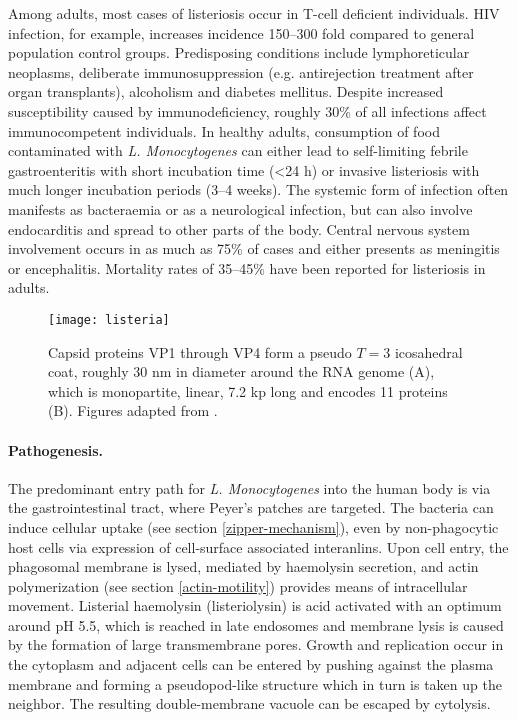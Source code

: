 Among adults, most cases of listeriosis occur in T-cell deficient individuals. HIV infection, for example, increases incidence 150--300 fold compared to general population control groups. Predisposing conditions include lymphoreticular neoplasms, deliberate immunosuppression (e.g. antirejection treatment after organ transplants), alcoholism and diabetes mellitus. Despite increased susceptibility caused by immunodeficiency, roughly 30\% of all infections affect immunocompetent individuals. In healthy adults, consumption of food contaminated with \textit{L. Monocytogenes} can either lead to self-limiting febrile gastroenteritis with short incubation time (\textless 24 h) or invasive listeriosis with much longer incubation periods (3--4 weeks). The systemic form of infection often manifests as bacteraemia or as a neurological infection, but can also involve endocarditis and spread to other parts of the body. Central nervous system involvement occurs in as much as 75\% of cases and either presents as meningitis or encephalitis. Mortality rates of 35--45\% have been reported for listeriosis in adults.

\begin{figure}
  \centering
  \texttt{[image: listeria]}
  \caption[Capsid structure and genome of rhinoviruses.]{Capsid proteins VP1 through VP4 form a pseudo $T=3$ icosahedral coat, roughly 30 nm in diameter around the RNA genome (A), which is monopartite, linear, 7.2 kp long and encodes 11 proteins (B). Figures adapted from \cite{Lebreton2015}.}
  \label{fig:listeria}
\end{figure}

\paragraph{Pathogenesis.}
The predominant entry path for \textit{L. Monocytogenes} into the human body is via the gastrointestinal tract, where Peyer's patches are targeted. The bacteria can induce cellular uptake (see section \ref{zipper-mechanism}), even by non-phagocytic host cells via expression of cell-surface associated interanlins. Upon cell entry, the phagosomal membrane is lysed, mediated by haemolysin secretion, and actin polymerization (see section \ref{actin-motility}) provides means of intracellular movement. Listerial haemolysin (listeriolysin) is acid activated with an optimum around pH 5.5, which is reached in late endosomes and membrane lysis is caused by the formation of large transmembrane pores. Growth and replication occur in the cytoplasm and adjacent cells can be entered by pushing against the plasma membrane and forming a pseudopod-like structure which in turn is taken up the neighbor. The resulting double-membrane vacuole can be escaped by cytolysis.

